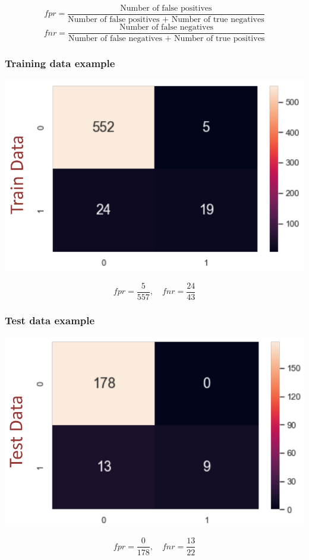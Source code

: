 \documentclass[11pt]{article}
\begin{document}
\[fpr = \frac{\text{Number of false positives}}{\text{Number of false positives + Number of true negatives}}\]
\[fnr = \frac{\text{Number of false negatives}}{\text{Number of false negatives + Number of true positives}}\]
\subsubsection{Training data example}
\label{sec:orgb464e67}
\begin{center}
\includegraphics[width=.9\linewidth]{./images/binary-classification-training-data-prediction.png}
\end{center}
\[fpr = \frac{5}{557}, \quad fnr = \frac{24}{43}\]
\subsubsection{Test data example}
\label{sec:org30b710c}
\begin{center}
\includegraphics[width=.9\linewidth]{./images/binary-classification-test-data-prediction.png}
\end{center}
\[fpr = \frac{0}{178}, \quad fnr = \frac{13}{22}\]
\end{document}
